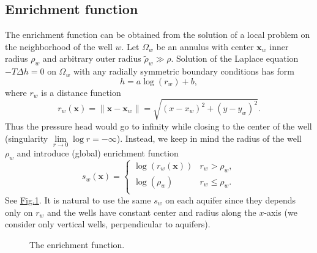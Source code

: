 \documentclass{elsarticle}
\newcommand{\fig}[1]{\hyperref[#1]{Fig.\ref{#1}}}
\newcommand{\figpath}{../graphics/}
\def\vc#1{\mathbf{\boldsymbol{#1}}}     %
\newcommand{\bx}{\vc{x}}
\newcommand{\notePE}[1]{{\color{Orange} \textbf{PE: } \textit{#1}}}
\begin{document}
\subsection{Enrichment function}
The enrichment function can be obtained from the solution of a local problem on the neighborhood of the well $w$.
Let $\Omega_w$ be an annulus with center $\vc x_w$ inner radius $\rho_w$ and arbitrary outer radius $\tilde \rho_w \gg \rho$.
Solution of the Laplace equation $-T \Delta h = 0$ on $\Omega_w$ with any radially symmetric boundary conditions has form
%
\begin{equation} \label{eqn:solution_form}
  h = a \log(r_w)+b, %
\end{equation}
where $r_w$ is a distance function
\begin{equation} \label{eqn:distance}
r_w(\vc{x}) = \|\bx - \vc{x}_w\|= \sqrt{(x-x_w)^2+(y-y_w)^2}.
\end{equation}
%
Thus the pressure head would go to infinity while closing to the center of the well (singularity $\lim \limits_{r\rightarrow 0} \log r= -\infty$).
Instead, we keep in mind the radius of the well $\rho_w$ and introduce (global) enrichment function
%
\begin{equation}
\label{eqn:enrich_func}
s_w(\bx) = 
  \begin{cases}
  \log(r_w(\bx)) & r_w > \rho_w,\\
  \log(\rho_w) & r_w \le \rho_w.\\
  \end{cases}
\end{equation}
See \fig{fig:enrich_func}.
It is natural to use the same $s_w$ on each aquifer since they depends only on $r_w$ and the wells have constant center and radius along the $x$-axis
(we consider only vertical wells, perpendicular to aquifers).
%

\begin{figure}[!htb]
  \begin{center}         
    \def\svgwidth{0.5\textwidth}
    
  \end{center}
  \caption{The enrichment function.}
  \label{fig:enrich_func}
\end{figure}
\end{document}
